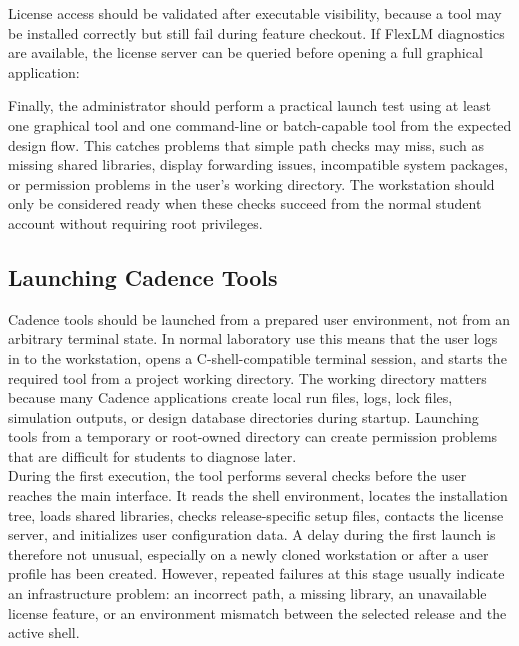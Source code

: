 \noindent License access should be validated after executable visibility, because a tool may be
installed correctly but still fail during feature checkout. If FlexLM diagnostics are available, the
license server can be queried before opening a full graphical application:


\noindent Finally, the administrator should perform a practical launch test using at least one
graphical tool and one command-line or batch-capable tool from the expected design flow. This catches
problems that simple path checks may miss, such as missing shared libraries, display forwarding
issues, incompatible system packages, or permission problems in the user's working directory. The
workstation should only be considered ready when these checks succeed from the normal student
account without requiring root privileges.

\subsection{Launching Cadence Tools}

Cadence tools should be launched from a prepared user environment, not from an arbitrary terminal
state. In normal laboratory use this means that the user logs in to the workstation, opens a
C-shell-compatible terminal session, and starts the required tool from a project working directory.
The working directory matters because many Cadence applications create local run files, logs, lock
files, simulation outputs, or design database directories during startup. Launching tools from a
temporary or root-owned directory can create permission problems that are difficult for students to
diagnose later.\\

\noindent During the first execution, the tool performs several checks before the user reaches the
main interface. It reads the shell environment, locates the installation tree, loads shared
libraries, checks release-specific setup files, contacts the license server, and initializes user
configuration data. A delay during the first launch is therefore not unusual, especially on a newly
cloned workstation or after a user profile has been created. However, repeated failures at this stage
usually indicate an infrastructure problem: an incorrect path, a missing library, an unavailable
license feature, or an environment mismatch between the selected release and the active shell.\\

